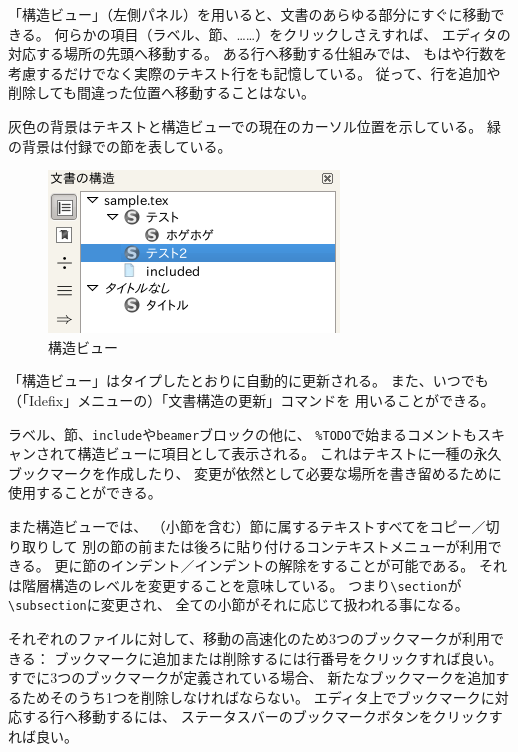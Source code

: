 「構造ビュー」（左側パネル）を用いると、文書のあらゆる部分にすぐに移動できる。
何らかの項目（ラベル、節、……）をクリックしさえすれば、
エディタの対応する場所の先頭へ移動する。
ある行へ移動する仕組みでは、
もはや行数を考慮するだけでなく実際のテキスト行をも記憶している。
従って、行を追加や削除しても間違った位置へ移動することはない。

灰色の背景はテキストと構造ビューでの現在のカーソル位置を示している。
緑の背景は付録での節を表している。

\begin{figure}[H]
  \centering
  \includegraphics{doc5.png}
  \caption{構造ビュー}
\end{figure}

「構造ビュー」はタイプしたとおりに自動的に更新される。
また、いつでも（「Idefix」メニューの）「文書構造の更新」コマンドを
用いることができる。

ラベル、節、\texttt{include}や\texttt{beamer}ブロックの他に、
\verb+%TODO+で始まるコメントもスキャンされて構造ビューに項目として表示される。
これはテキストに一種の永久ブックマークを作成したり、
変更が依然として必要な場所を書き留めるために使用することができる。

また構造ビューでは、
（小節を含む）節に属するテキストすべてをコピー／切り取りして
別の節の前または後ろに貼り付けるコンテキストメニューが利用できる。
更に節のインデント／インデントの解除をすることが可能である。
それは階層構造のレベルを変更することを意味している。
つまり\verb+\section+が\verb+\subsection+に変更され、
全ての小節がそれに応じて扱われる事になる。

それぞれのファイルに対して、移動の高速化のため3つのブックマークが利用できる：
ブックマークに追加または削除するには行番号をクリックすれば良い。
すでに3つのブックマークが定義されている場合、
新たなブックマークを追加するためそのうち1つを削除しなければならない。
エディタ上でブックマークに対応する行へ移動するには、
ステータスバーのブックマークボタンをクリックすれば良い。

